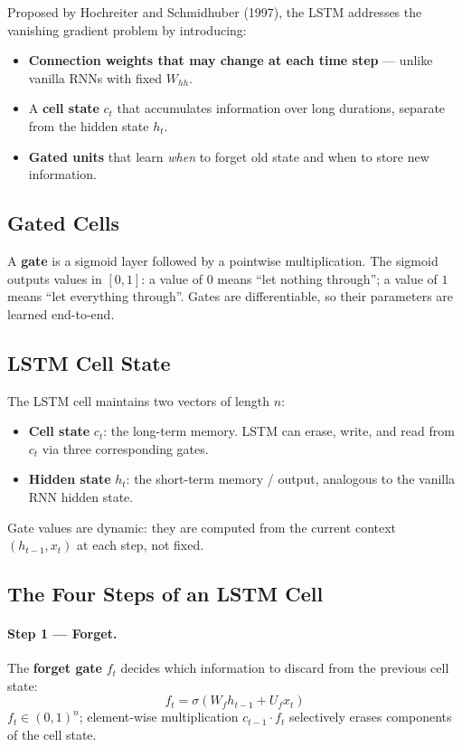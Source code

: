 \documentclass[11pt,a4paper]{article}
\theoremstyle{definition}
\theoremstyle{plain}
\theoremstyle{remark}
\begin{document}
Proposed by Hochreiter and Schmidhuber (1997), the LSTM addresses the vanishing gradient problem by introducing:
\begin{itemize}
    \item \textbf{Connection weights that may change at each time step} --- unlike vanilla RNNs with fixed $W_{hh}$.
    \item A \textbf{cell state} $c_t$ that accumulates information over long durations, separate from the hidden state $h_t$.
    \item \textbf{Gated units} that learn \emph{when} to forget old state and when to store new information.
\end{itemize}

\subsection{Gated Cells}

A \textbf{gate} is a sigmoid layer followed by a pointwise multiplication. The sigmoid outputs values in $[0, 1]$: a value of $0$ means ``let nothing through''; a value of $1$ means ``let everything through''. Gates are differentiable, so their parameters are learned end-to-end.

\subsection{LSTM Cell State}

The LSTM cell maintains two vectors of length $n$:
\begin{itemize}
    \item \textbf{Cell state} $c_t$: the long-term memory. LSTM can erase, write, and read from $c_t$ via three corresponding gates.
    \item \textbf{Hidden state} $h_t$: the short-term memory / output, analogous to the vanilla RNN hidden state.
\end{itemize}

Gate values are dynamic: they are computed from the current context $(h_{t-1}, x_t)$ at each step, not fixed.

\subsection{The Four Steps of an LSTM Cell}

\paragraph{Step 1 --- Forget.}
The \textbf{forget gate} $f_t$ decides which information to discard from the previous cell state:
\[
    f_t = \sigma(W_f h_{t-1} + U_f x_t)
\]
$f_t \in (0,1)^n$; element-wise multiplication $c_{t-1} \cdot f_t$ selectively erases components of the cell state.
\end{document}
